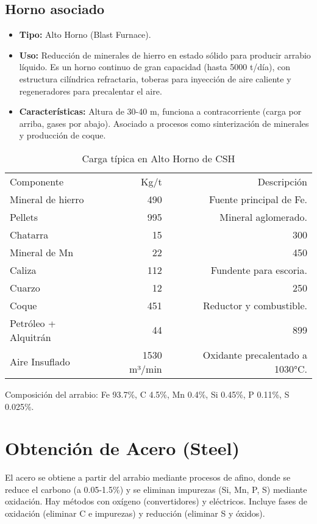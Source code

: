 \documentclass[12pt,a4paper]{article}
\begin{document}
\subsection{Horno asociado}
\begin{itemize}
\item \textbf{Tipo:} Alto Horno (Blast Furnace).
\item \textbf{Uso:} Reducción de minerales de hierro en estado sólido para producir arrabio líquido. Es un horno continuo de gran capacidad (hasta 5000 t/día), con estructura cilíndrica refractaria, toberas para inyección de aire caliente y regeneradores para precalentar el aire.
\item \textbf{Características:} Altura de 30-40 m, funciona a contracorriente (carga por arriba, gases por abajo). Asociado a procesos como sinterización de minerales y producción de coque.
\end{itemize}
\begin{table}[h]
    \centering
    \caption{Carga típica en Alto Horno de CSH}
    \begin{tabular}{|l|r|r|}
        Componente & Kg/t & Descripción \\
        Mineral de hierro & 490 & Fuente principal de Fe. \\
        Pellets & 995 & Mineral aglomerado. \\
        Chatarra & 15 & 300 \\
        Mineral de Mn & 22 & 450 \\
        Caliza & 112 & Fundente para escoria. \\
        Cuarzo & 12 & 250 \\
        Coque & 451 & Reductor y combustible. \\
        Petróleo + Alquitrán & 44 & 899 \\
        Aire Insuflado & 1530 m³/min & Oxidante precalentado a 1030°C. \\
    \end{tabular}
\end{table}
Composición del arrabio: Fe 93.7\%, C 4.5\%, Mn 0.4\%, Si 0.45\%, P 0.11\%, S 0.025\%.
\section{Obtención de Acero (Steel)}
El acero se obtiene a partir del arrabio mediante procesos de afino, donde se reduce el carbono (a 0.05-1.5\%) y se eliminan impurezas (Si, Mn, P, S) mediante oxidación. Hay métodos con oxígeno (convertidores) y eléctricos. Incluye fases de oxidación (eliminar C e impurezas) y reducción (eliminar S y óxidos).
\end{document}
